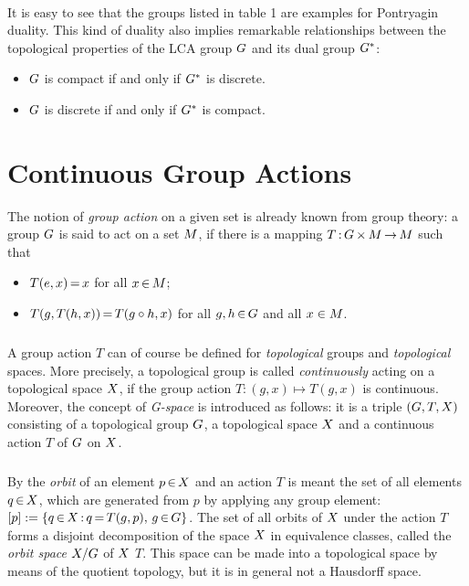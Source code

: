 \documentclass[11pt,twoside]{article}
\begin{document}
\paragraph{}
It is easy to see
that the groups listed in table 1 are examples for Pontryagin duality.
This kind of duality also implies remarkable relationships
between the topological properties of the LCA group $G$
and its dual group $G^*$:

\begin{itemize}[leftmargin=9mm,itemsep=1pt]
\item[1.]
$G$ is compact  if and only if ${G}^*$ is discrete.

\item[2.]
$G$ is discrete if and only if ${G}^*$ is compact.
\end{itemize}

\section{Continuous Group Actions}                                             %
The notion of \textit{group action} on a given set is already known
from group theory:
a group $G$ is said to act on a set $M$,
if there is a mapping $T {\,:\,} G {\,\times\,} M {\,\to\,} M$ such that

\begin{itemize}[leftmargin=22pt]
\item[(1)]
$T(e,x) {\,=\,} x$ for all $x {\,\in\,} M$;

\item[(2)]
$T(g,T(h,x)) {\,=\,} T(g \circ h,x)$
for all $g,h {\,\in\,} G$ and all $x \in M$.
\end{itemize}

\subparagraph{}
A group action $T$ can of course be defined
for \textit{topological} groups and \textit{topological} spaces.
More precisely,
a topological group is called \textit{continuously} acting
on a topological space $X$,
if the group action $T:(g,x) \mapsto T(g,x)$ is continuous.
Moreover,
the concept of \textit{G-space} is introduced as follows:
it is a triple $(G,T,X)$
consisting of a topological group $G$,
a topological space $X$
and a continuous action $T$ of $G$ on $X$.

\subparagraph{}
By the \textit{orbit} of an element $p {\,\in\,} X$ and an action $T$
is meant the set of all elements $q {\,\in\,} X$,
which are generated from $p$ by applying any group element:
$[p] := \{ q {\,\in\,} X {\,:\,} q {\,=\,} T(g,p), \, g {\,\in\,} G \}$.
The set of all orbits of $X$ under the action $T$
forms a disjoint decomposition of the space $X$ in equivalence classes,
called the \textit{orbit space} $X/G$ of $X$ {\wrt} $T$.
This space can be made into a topological space
by means of the quotient topology,
but it is in general not a Hausdorff space.
\end{document}

